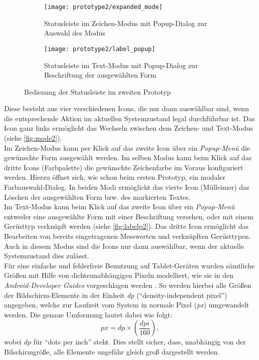 \begin{figure}[ht]
  \begin{subfigure}[t]{0.4\textwidth}
    \texttt{[image: prototype2/expanded\_mode]}
    \caption{Statusleiste im Zeichen-Modus mit Popup-Dialog zur Auswahl des Modus}
    \label{fig:mode2}
  \end{subfigure}
  \begin{subfigure}[t]{0.4\textwidth}
    \texttt{[image: prototype2/label\_popup]}
    \caption{Statusleiste im Text-Modus mit Popup-Dialog zur Beschriftung der ausgewählten Form}
    \label{fig:labelp2}
  \end{subfigure}
  \centering
  \caption{Bedienung der Statusleiste im zweiten Prototyp}
  \label{fig:bar2}
\end{figure}

\noindent
Diese besteht aus vier verschiedenen Icons, die nur dann auswählbar sind, wenn die entsprechende Aktion im aktuellen Systemzustand legal durchführbar ist.
Das Icon ganz links ermöglicht das Wechseln zwischen dem Zeichen- und Text-Modus (siehe \autoref{fig:mode2}). \\

Im Zeichen-Modus kann per Klick auf das zweite Icon über ein \emph{Popup-Menü} die gewünschte Form ausgewählt werden. 
Im selben Modus kann beim Klick auf das dritte Icons (Farbpalette) die gewünschte Zeichenfarbe im Voraus konfiguriert werden. Hierzu öffnet sich, wie schon beim ersten Prototyp, ein modaler Farbauswahl-Dialog.
In beiden Modi ermöglicht das vierte Icon (Mülleimer) das Löschen der ausgewählten Form bzw. des markierten Textes. \\

Im Text-Modus kann beim Klick auf das zweite Icon über ein \emph{Popup-Menü} entweder eine ausgewählte Form mit einer Beschriftung versehen, oder mit einem Gerüsttyp verknüpft werden (siehe \autoref{fig:labelp2}).
Das dritte Icon ermöglicht das Bearbeiten von bereits eingetragenen Messwerten und verknüpften Gerüsttypen.
Auch in diesem Modus sind die Icons nur dann auswählbar, wenn der aktuelle Systemzustand dies zulässt. \\

Für eine einfache und fehlerfreie Benutzung auf Tablet-Geräten wurden sämtliche Größen mit Hilfe von dichteunabhängigen Pixeln modelliert, wie sie in den \emph{Android-Developer Guides} vorgeschlagen werden \citep{DP18}.
So werden hierbei alle Größen der Bildschirm-Elemente in der Einheit \emph{dp} (``density-independent pixel'') angegeben, welche zur Laufzeit vom System in normale Pixel (\emph{px}) umgewandelt werden.
Die genaue Umformung lautet dabei wie folgt:
$$
px =  dp \times (\frac{dpi}{160}),
$$
wobei $dp$ für ``dots per inch'' steht.
Dies stellt sicher, dass, unabhängig von der Bilschirmgröße, alle Elemente ungefähr gleich groß dargestellt werden. \\

